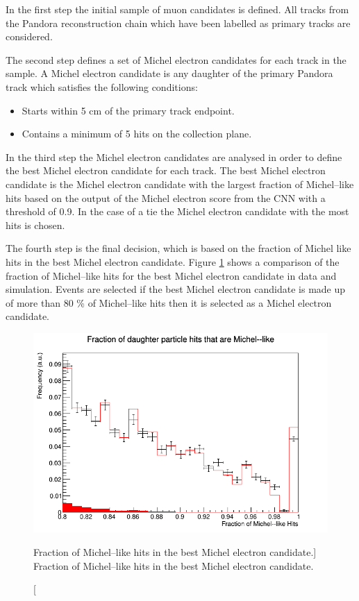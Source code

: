 In the first step the initial sample of muon candidates is defined. All tracks
from the Pandora reconstruction chain which have been labelled as primary tracks
are considered.

The second step defines a set of Michel electron candidates for each track in
the sample. A Michel electron candidate is any daughter of the primary Pandora
track which satisfies the following conditions:
\begin{itemize}
	\item Starts within 5 cm of the primary track endpoint.
	\item Contains a minimum of 5 hits on the collection plane.
\end{itemize}

In the third step the Michel electron candidates are analysed in order to define
the best Michel electron candidate for each track. The best Michel electron
candidate is the Michel electron candidate with the largest fraction of
Michel--like hits based on the output of the Michel electron score from the CNN
with a threshold of 0.9. In the case of a tie the Michel electron candidate with
the most hits is chosen.

The fourth step is the final decision, which is based on the fraction of Michel
like hits in the best Michel electron candidate. Figure 
\ref{fig:michel_like_frac} shows a comparison of the fraction of Michel--like 
hits for the best Michel electron candidate in \protodune{} data and 
simulation.  Events are selected if the best Michel electron candidate is made 
up of more than 80 \% of Michel--like hits then it is selected as a Michel 
electron candidate.
\begin{figure}
	\centering
	\includegraphics[width=\textwidth]{figures/michel_like_frac.png}
	\caption
	[Fraction of Michel--like hits in the best Michel electron candidate.]
	{Fraction of Michel--like hits in the best Michel electron candidate.}
	\label{fig:michel_like_frac}
\end{figure}

